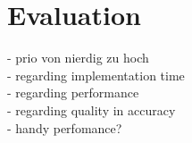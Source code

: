 
\section{Evaluation}
- prio von nierdig zu hoch \\
- regarding implementation time \\
- regarding performance \\
- regarding quality in accuracy \\
- handy perfomance? \\
